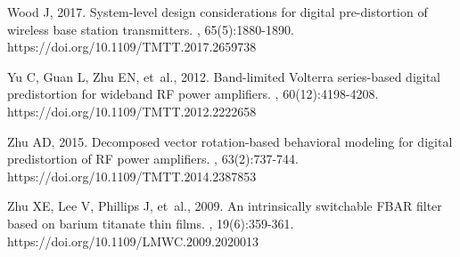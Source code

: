 \documentclass[twoside,twocolumn]{article}
\begin{document}
{{\begin{thebibliography}{}
Wood J, 2017.
\newblock System-level design considerations for digital pre-distortion of wireless base station transmitters.
, 65(5):1880-1890. \\
  https://doi.org/10.1109/TMTT.2017.2659738

Yu C, Guan L, Zhu EN, {et~al.}, 2012.
\newblock Band-limited Volterra series-based digital predistortion for wideband RF power amplifiers.
, 60(12):4198-4208. \\
  https://doi.org/10.1109/TMTT.2012.2222658

Zhu AD, 2015.
\newblock Decomposed vector rotation-based behavioral modeling for digital predistortion of RF power amplifiers.
, 63(2):737-744. \\
  https://doi.org/10.1109/TMTT.2014.2387853

Zhu XE, Lee V, Phillips J, {et~al.}, 2009.
\newblock An intrinsically switchable FBAR filter based on barium titanate thin films.
, 19(6):359-361. \\
  https://doi.org/10.1109/LMWC.2009.2020013

\end{thebibliography}



}}
\end{document}
